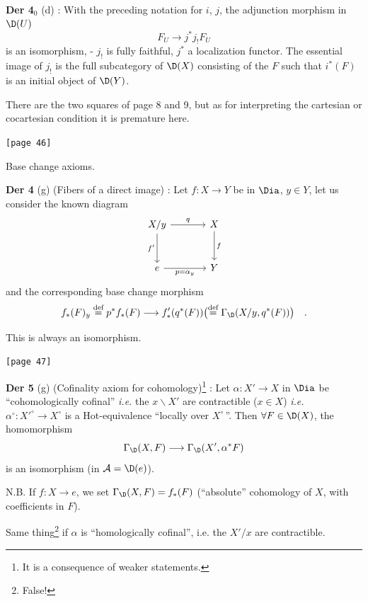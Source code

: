 
\noindent\textbf{Der 4}$_{0}$ (d) : With the preceding notation for $i$, $j$, the adjunction morphism in $\D(U)$
\[ F_{U} \longrightarrow j^{*} j_{!} F_{U} \]
is an isomorphism, - $j_{!}$ is fully faithful, $j^{*}$ a localization functor. The essential image of $j_{!}$ is the full subcategory of $\D(X)$ consisting of the $F$ such that $i^{*}(F)$ is an initial object of $\D(Y)$.

There are the two squares of page 8 and 9, but as for interpreting the cartesian or cocartesian condition it is premature here.

\noindent{}\texttt{[page 46]}

\noindent Base change axioms.

\noindent\textbf{Der 4} (g) (Fibers of a direct image) : Let $f : X \to Y$ be in $\Dia$, $y \in Y$, let us consider the known diagram
\[
\begin{tikzcd}[row sep=large, column sep=large]
X/y \arrow[r, "q"] \arrow[d, "f'"'] & X \arrow[d, "f"] \\
e \arrow[r, "p = \alpha_{y}"'] & Y
\end{tikzcd}
\]
and the corresponding base change morphism
\[ f_{*}(F)_{y} \overset{\text{def}}{=} p^{*} f_{*}(F) \longrightarrow f'_{*}(q^{*}(F))\bigl(\overset{\text{def}}{=} \Gamma_{\D}(X/y, q^{*}(F))\bigr) \quad . \]

\noindent This is always an isomorphism.

\noindent{}\texttt{[page 47]}

\noindent\textbf{Der 5} (g) (Cofinality axiom for cohomology)\footnote[14]{It is a consequence of weaker statements.} : Let $\alpha : X' \to X$ in $\Dia$ be ``cohomologically cofinal'' \textit{i.e.} the $x\backslash X'$ are contractible ($x \in X$) \textit{i.e.} $\alpha^{\circ} : {X'}^{\circ} \to X^{\circ}$ is a Hot-equivalence ``locally over $X^{\circ}$\,''. Then $\forall F \in \D(X)$, the homomorphism
\[ \Gamma_{\D}(X, F) \longrightarrow \Gamma_{\D}(X', \alpha^{*} F) \]
is an isomorphism (in $\mathcal{A} = \D(e)$).

\noindent N.B. If $f : X \to e$, we set $\Gamma_{\D}(X, F) = f_{*}(F)$ (``absolute'' cohomology of $X$, with coefficients in $F$).

\noindent Same thing\footnote[15]{False!} if $\alpha$ is ``homologically cofinal'', i.e. the $X'/x$ are contractible.



